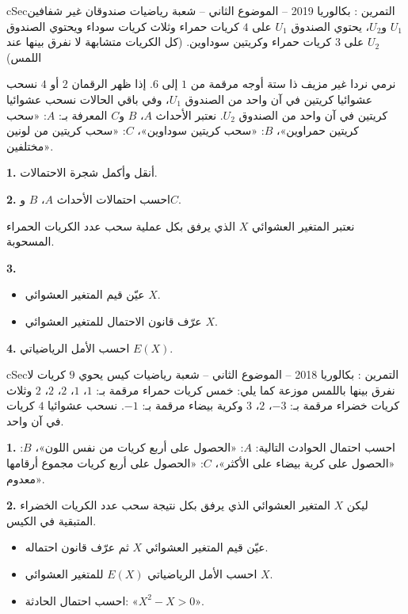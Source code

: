 \documentclass[12pt,a4paper]{article}
\newenvironment{BOX}[2]{\begin{otherlanguage}{english}\begin{arbox}{#1}{#2}}{\end{arbox}\end{otherlanguage}}
\newcounter{exo}
\newenvironment{tamrin}[1]{\stepcounter{exo}\begin{BOX}{cSec}{التمرين \theexo: #1}}{\end{BOX}}
\newenvironment{LTR}{\begin{otherlanguage}{english}}{\end{otherlanguage}}
\renewcommand{\ldots}{\mathinner{\ldotp\ldotp\ldotp}}
\newenvironment{sq}{\begin{itemize}[leftmargin=2.4em,itemsep=3pt]}{\end{itemize}}
\newcommand{\qa}{\item[(أ)]}\newcommand{\qb}{\item[(ب)]}\newcommand{\qc}{\item[(جـ)]}\newcommand{\qd}{\item[(د)]}\newcommand{\qe}{\item[(هـ)]}
\newcommand{\QQ}[1]{\par\smallskip\textbf{#1.} }
\begin{document}
\begin{tamrin}{بكالوريا 2019 -- الموضوع الثاني -- شعبة رياضيات}
صندوقان غير شفافين $U_1$ و$U_2$، يحتوي الصندوق $U_1$ على $4$ كريات حمراء وثلاث كريات سوداء ويحتوي الصندوق $U_2$ على $3$ كريات حمراء وكريتين سوداوين. (كل الكريات متشابهة لا نفرق بينها عند اللمس)

نرمي نردا غير مزيف ذا ستة أوجه مرقمة من $1$ إلى $6$.
إذا ظهر الرقمان $2$ أو $4$ نسحب عشوائيا كريتين في آن واحد من الصندوق $U_1$، وفي باقي الحالات نسحب عشوائيا كريتين في آن واحد من الصندوق $U_2$.
نعتبر الأحداث $A$، $B$ و$C$ المعرفة بـ: $A$: «سحب كريتين حمراوين»، $B$: «سحب كريتين سوداوين»، $C$: «سحب كريتين من لونين مختلفين».
\begin{center}\begin{LTR}\end{LTR}\end{center}
\QQ{1} أنقل وأكمل شجرة الاحتمالات.
\QQ{2} احسب احتمالات الأحداث $A$، $B$ و$C$.

نعتبر المتغير العشوائي $X$ الذي يرفق بكل عملية سحب عدد الكريات الحمراء المسحوبة.
\QQ{3}
\begin{sq}
\qa عيّن قيم المتغير العشوائي $X$.
\qb عرّف قانون الاحتمال للمتغير العشوائي $X$.
\end{sq}
\QQ{4} احسب الأمل الرياضياتي $E(X)$.
\end{tamrin}

\begin{tamrin}{بكالوريا 2018 -- الموضوع الثاني -- شعبة رياضيات}
كيس يحوي $9$ كريات لا نفرق بينها باللمس موزعة كما يلي:
خمس كريات حمراء مرقمة بـ: $1$، $1$، $2$، $2$، $2$ وثلاث كريات خضراء مرقمة بـ: $-3$، $2$، $3$ وكرية بيضاء مرقمة بـ: $-1$.
نسحب عشوائيا $4$ كريات في آن واحد.

\QQ{1} احسب احتمال الحوادث التالية:
$A$: «الحصول على أربع كريات من نفس اللون»، $B$: «الحصول على كرية بيضاء على الأكثر»، $C$: «الحصول على أربع كريات مجموع أرقامها معدوم».
\QQ{2} ليكن $X$ المتغير العشوائي الذي يرفق بكل نتيجة سحب عدد الكريات الخضراء المتبقية في الكيس.
\begin{sq}
\qa عيّن قيم المتغير العشوائي $X$ ثم عرّف قانون احتماله.
\qb احسب الأمل الرياضياتي $E(X)$ للمتغير العشوائي $X$.
\qc احسب احتمال الحادثة: «$X^2-X>0$».
\end{sq}
\end{tamrin}
\end{document}
